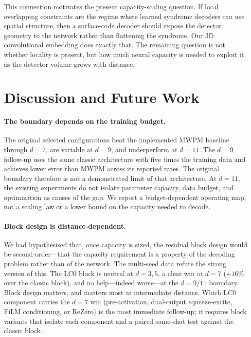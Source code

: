 \documentclass[11pt,a4paper]{article}
\begin{document}
This connection motivates the present capacity-scaling question. If local
overlapping constraints are the regime where learned syndrome decoders can
use spatial structure, then a surface-code decoder should expose the detector
geometry to the network rather than flattening the syndrome. Our 3D
convolutional embedding does exactly that. The remaining question is not
whether locality is present, but how much neural capacity is needed to
exploit it as the detector volume grows with distance.

\section{Discussion and Future Work}

\paragraph{The boundary depends on the training budget.}
The original selected configurations beat the implemented MWPM baseline
through $d=7$, are variable at $d=9$, and underperform at $d=11$.
The $d=9$ follow-up uses the same classic architecture with five times
the training data and achieves lower error than MWPM across its reported
rates. The original boundary therefore is not a demonstrated limit of
that architecture. At $d=11$, the existing experiments do not isolate
parameter capacity, data budget, and optimization as causes of the gap.
We report a budget-dependent operating map, not a scaling law or a
lower bound on the capacity needed to decode.

\paragraph{Block design is distance-dependent.}
We had hypothesised that, once capacity is sized, the residual block design
would be second-order---that the capacity requirement is a property of the
decoding problem rather than of the network. The multi-seed data refute the
strong version of this. The LC0 block is neutral at $d=3,5$, a clear win at
$d=7$ ($+16\%$ over the classic block), and no help---indeed worse---at the
$d=9/11$ boundary. Block design matters, and matters most at intermediate
distance. Which LC0 component carries the $d=7$ win (pre-activation,
dual-output squeeze-excite, FiLM conditioning, or ReZero) is the most
immediate follow-up; it requires block variants that isolate each component
and a paired same-shot test against the classic block.
\end{document}
